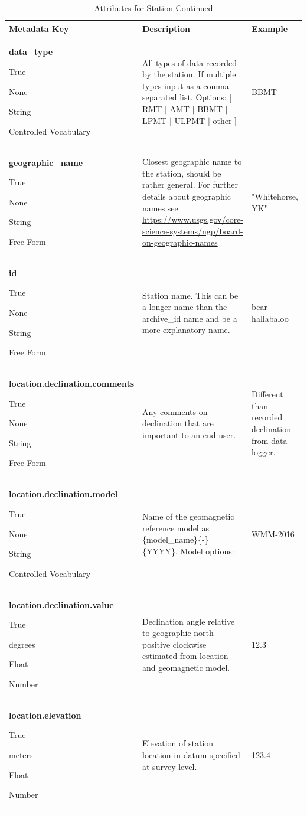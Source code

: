 \documentclass[12pt]{article}
\newcommand{\entry}[7]{
	\textbf{#1} 
	\begin{itemize}[topsep=5pt,itemsep=-.1pt,parsep=-2pt,partopsep=0pt,labelwidth=2em,align=left,itemindent=1em]
		\begin{small}
			\item[Required:] #2
			\item[Units:] #3
			\item[Type:] #4
			\item[Style:] #5
		\end{small}
	\end{itemize} & #6 & #7 \\ \midrule}
\begin{document}
\clearpage
\newpage
\begin{table}[h!]
	\caption*{Attributes for Station  Continued}
	\begin{tabular}{p{}>{\raggedright}p{}p{}}
		\textbf{Metadata Key} & \textbf{Description} & \textbf{Example} \\ \toprule
		\entry{data\_type}{True}{None}{String}{Controlled Vocabulary}{All types of data recorded by the station. If multiple types input as a comma separated list. \qquad Options: [ RMT $|$ AMT $|$ BBMT $|$ LPMT $|$ ULPMT $|$ other ]}{BBMT}
		\entry{geographic\_name}{True}{None}{String}{Free Form}{Closest geographic name to the station, should be rather general.  For further details about geographic names see \url{https://www.usgs.gov/core-science-systems/ngp/board-on-geographic-names}}{"Whitehorse, YK"}
		\entry{id}{True}{None}{String}{Free Form}{Station name.  This can be a longer name than the archive\_id name and be a more explanatory name.}{bear hallabaloo}
		\entry{location.declination.comments}{True}{None}{String}{Free Form}{Any comments on declination that are important to an end user.}{Different than recorded declination from data logger.}
		\entry{location.declination.model}{True}{None}{String}{Controlled Vocabulary}{Name of the geomagnetic reference model as \{model\_name\}\{-\}\{YYYY\}. Model options: \qquad [ EMAG2 $|$ EMM $|$ HDGM $|$ IGRF $|$ WMM ]}{WMM-2016}
		\entry{location.declination.value}{True}{degrees}{Float}{Number}{Declination angle relative to geographic north positive clockwise estimated from location and geomagnetic model.}{12.3}
		\entry{location.elevation}{True}{meters}{Float}{Number}{Elevation of station location in datum specified at survey level.}{123.4}
	\end{tabular}
\end{table}
\end{document}

